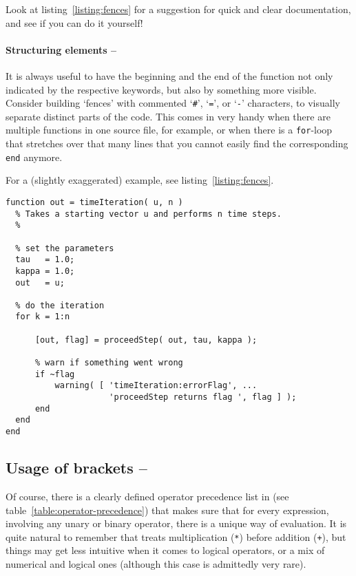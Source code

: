 Look at listing~\ref{listing:fences} for a suggestion for quick and clear
documentation, and see if you can do it yourself!


\paragraph{Structuring elements -- \cleansymbol\cleansymbol\cleansymbol}
It is always useful to have the beginning and the end of the function not only
indicated by the respective keywords, but also by something more visible.
Consider building `fences' with commented `\lstinline!#!', `\lstinline!=!', or
`\lstinline!-!' characters, to visually separate distinct parts of the code.
This comes in very handy when there are multiple functions in one source file,
for example, or when there is a \lstinline!for!-loop that stretches over that
many lines that you cannot easily find the corresponding \lstinline!end!
anymore.

For a (slightly exaggerated) example, see listing~\ref{listing:fences}.

\begin{lstlisting}[float,label={listing:fences},caption={Function in which `\lstinline!-!'-fences are used to emphasize the functionally separate sections of the code.}]
function out = timeIteration( u, n )
  % Takes a starting vector u and performs n time steps.
  %

  % set the parameters
  tau   = 1.0;
  kappa = 1.0;
  out   = u;

  % do the iteration
  for k = 1:n

      [out, flag] = proceedStep( out, tau, kappa );

      % warn if something went wrong
      if ~flag
          warning( [ 'timeIteration:errorFlag', ...
                     'proceedStep returns flag ', flag ] );
      end
  end
end
\end{lstlisting}


\subsection{Usage of brackets -- \cleansymbol\cleansymbol}
Of course, there is a clearly defined operator precedence list in \matlab{}
(see table~\ref{table:operator-precedence}) that makes sure that for every
\matlab{} expression, involving any unary or binary operator, there is a
unique way of evaluation. It is quite natural to remember that \matlab{}
treats multiplication (\lstinline!*!) before addition (\lstinline!+!), but
things may get less intuitive when it comes to logical operators, or a mix of
numerical and logical ones (although this case is admittedly very rare).

